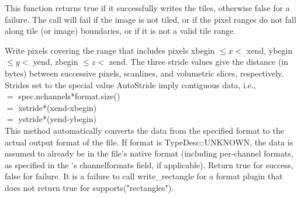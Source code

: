 This function returns {\cf true} if it successfully writes the tiles,
otherwise {\cf false} for a failure.
The call will fail if the image is not tiled, or if the pixel ranges
do not fall along tile (or image) boundaries, or if it is not a valid
tile range.
\apiend


Write pixels covering the range that includes pixels {\kw xbegin} $\le x <$ {\kw xend},
{\kw ybegin} $\le y <$ {\kw yend}, {\kw zbegin} $\le z <$ {\kw zend}.
The three stride values give the distance
(in bytes) between successive pixels, scanlines, and volumetric slices,
respectively.  Strides set to the special value {\kw AutoStride} imply
contiguous data, i.e.,\\
 $=$ {\kw spec.nchannels*format.size()} \\
 $=$ {\kw xstride*(xend-xbegin)} \\
 $=$ {\kw ystride*(yend-ybegin)}\\
This method automatically converts the data from the specified 
{\kw format} to the actual output format of the file.  
If {\cf format} is {\cf TypeDesc::UNKNOWN}, the data is assumed to
already be in the file's native format (including per-channel formats, 
as specified in the \ImageSpec's {\cf channelformats} field, if applicable).
Return {\kw true}
for success, {\kw false} for failure.  It is a failure to call 
{\kw write_rectangle} for a format plugin that does not return true for
{\kw supports("rectangles")}.

\apiend


